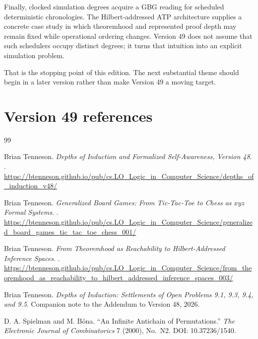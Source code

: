 \documentclass[11pt]{article}
\theoremstyle{remark}
\newcommand{\depthsurl}{https://btenneson.github.io/pub/cs.LO_Logic_in_Computer_Science/depths_of_induction_v48/}
\newcommand{\gbgurl}{https://btenneson.github.io/pub/cs.LO_Logic_in_Computer_Science/generalized_board_games_tic_tac_toe_chess_001/}
\newcommand{\hilberturl}{https://btenneson.github.io/pub/cs.LO_Logic_in_Computer_Science/from_theoremhood_as_reachability_to_hilbert_addressed_inference_spaces_003/}
\begin{document}
Finally, clocked simulation degrees acquire a GBG reading for scheduled deterministic chronologies.
The Hilbert-addressed ATP architecture supplies a concrete case study in which theoremhood and
represented proof depth may remain fixed while operational ordering changes.
Version 49 does not assume that such schedulers occupy distinct degrees; it turns that intuition into
an explicit simulation problem.

That is the stopping point of this edition.
The next substantial theme should begin in a later version rather than make Version 49 a moving target.

\clearpage
\section*{Version 49 references}

\begin{thebibliography}{99}

Brian Tenneson.
\newblock \emph{Depths of Induction and Formalized Self-Awareness, Version 48}.
.
\newblock \url{\depthsurl}

Brian Tenneson.
\newblock \emph{Generalized Board Games: From Tic-Tac-Toe to Chess as $xyz$ Formal Systems}.
.
\newblock \url{\gbgurl}

Brian Tenneson.
\newblock \emph{From Theoremhood as Reachability to Hilbert-Addressed Inference Spaces}.
.
\newblock \url{\hilberturl}

Brian Tenneson.
\newblock \emph{Depths of Induction: Settlements of Open Problems 9.1, 9.3, 9.4, and 9.5}.
\newblock Companion note to the Addendum to Version 48, 2026.

D. A. Spielman and M. B\'ona.
\newblock ``An Infinite Antichain of Permutations.''
\newblock \emph{The Electronic Journal of Combinatorics} 7 (2000), No.~N2.
\newblock DOI: 10.37236/1540.

\end{thebibliography}
\end{document}
